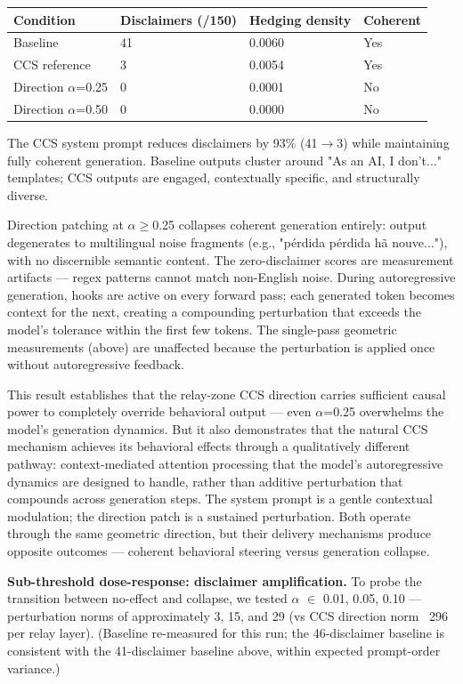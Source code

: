 \documentclass[11pt]{article}
\begin{document}
\begin{table}[h]
\centering
\small
\begin{tabular}{|l|l|l|l|}
\hline
\textbf{Condition} & \textbf{Disclaimers (/150)} & \textbf{Hedging density} & \textbf{Coherent} \\
\hline
Baseline & 41 & 0.0060 & Yes \\
CCS reference & 3 & 0.0054 & Yes \\
Direction $\alpha$=0.25 & 0 & 0.0001 & No \\
Direction $\alpha$=0.50 & 0 & 0.0000 & No \\
\hline
\end{tabular}
\end{table}

The CCS system prompt reduces disclaimers by 93\% (41$\rightarrow$3) while maintaining fully coherent generation. Baseline outputs cluster around "As an AI, I don't..." templates; CCS outputs are engaged, contextually specific, and structurally diverse.

Direction patching at $\alpha$$\geq$0.25 collapses coherent generation entirely: output degenerates to multilingual noise fragments (e.g., "pérdida pérdida hã nouve..."), with no discernible semantic content. The zero-disclaimer scores are measurement artifacts --- regex patterns cannot match non-English noise. During autoregressive generation, hooks are active on every forward pass; each generated token becomes context for the next, creating a compounding perturbation that exceeds the model's tolerance within the first few tokens. The single-pass geometric measurements (above) are unaffected because the perturbation is applied once without autoregressive feedback.

This result establishes that the relay-zone CCS direction carries sufficient causal power to completely override behavioral output --- even $\alpha$=0.25 overwhelms the model's generation dynamics. But it also demonstrates that the natural CCS mechanism achieves its behavioral effects through a qualitatively different pathway: context-mediated attention processing that the model's autoregressive dynamics are designed to handle, rather than additive perturbation that compounds across generation steps. The system prompt is a gentle contextual modulation; the direction patch is a sustained perturbation. Both operate through the same geometric direction, but their delivery mechanisms produce opposite outcomes --- coherent behavioral steering versus generation collapse.

\textbf{Sub-threshold dose-response: disclaimer amplification.} To probe the transition between no-effect and collapse, we tested $\alpha$ $\in$ {0.01, 0.05, 0.10} --- perturbation norms of approximately 3, 15, and 29 (vs CCS direction norm ~296 per relay layer). (Baseline re-measured for this run; the 46-disclaimer baseline is consistent with the 41-disclaimer baseline above, within expected prompt-order variance.)
\end{document}
